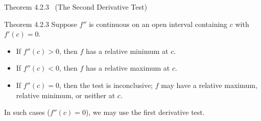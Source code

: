 \documentclass[aspectratio=169,11pt]{beamer}
\begin{document}
\begin{frame}[t]{Theorem 4.2.3 \ (The Second Derivative Test)}
  \vspace{0.2cm}
  \begin{block}{Theorem 4.2.3}
    Suppose $f''$ is continuous on an open interval containing $c$ with $f'(c)=0$.
    \begin{itemize}
      \item If $f''(c)>0$, then $f$ has a relative minimum at $c$.
      \item If $f''(c)<0$, then $f$ has a relative maximum at $c$.
      \item If $f''(c)=0$, then the test is inconclusive; $f$ may have a relative maximum, relative minimum, or neither at $c$.
    \end{itemize}
  \end{block}
  \small\vspace{0.1cm}
  In such cases ($f''(c)=0$), we may use the first derivative test.
\end{frame}
\end{document}
